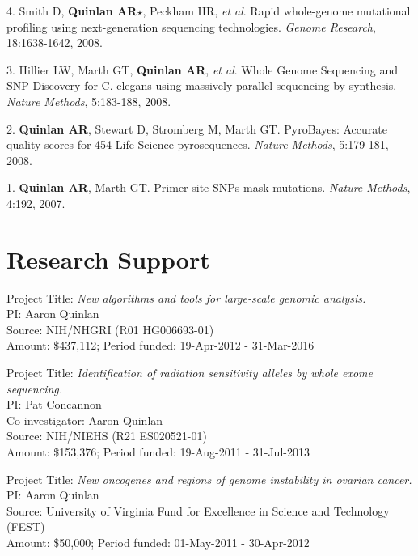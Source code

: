 \documentclass[margin,line]{cv}
\begin{document}
\begin{resume}
\begin{list}{*}{}
    \item[4.] Smith D, \textbf{Quinlan AR}$\star$, Peckham HR, \textit{et al}. 
    Rapid whole-genome mutational profiling using next-generation sequencing technologies. 
    \textit{Genome Research}, 18:1638-1642, 2008.

    \item[3.] Hillier LW, Marth GT, \textbf{Quinlan AR}, \textit{et al}. 
    Whole Genome Sequencing and SNP Discovery for C. elegans using massively parallel sequencing-by-synthesis. 
    \textit{Nature Methods}, 5:183-188, 2008.
    
    \item[2.] \textbf{Quinlan AR}, Stewart D, Stromberg M, Marth GT. 
    PyroBayes: Accurate quality scores for 454 Life Science pyrosequences.
    \textit{Nature Methods}, 5:179-181, 2008.
    
    \item[1.] \textbf{Quinlan AR}, Marth GT. 
    Primer-site SNPs mask mutations. 
    \textit{Nature Methods}, 4:192, 2007.

    \end{list}
    

    \section{\mysidestyle Research Support}

    Project Title: \textit{New algorithms and tools for large-scale genomic analysis.} \\
    PI: Aaron Quinlan \\
    Source: NIH/NHGRI (R01 HG006693-01) \\
    Amount: \$437,112; Period funded: 19-Apr-2012 - 31-Mar-2016
    
    Project Title: \textit{Identification of radiation sensitivity alleles by whole exome sequencing.} \\
    PI: Pat Concannon \\
    Co-investigator: Aaron Quinlan \\
    Source: NIH/NIEHS (R21 ES020521-01) \\
    Amount: \$153,376; Period funded: 19-Aug-2011 - 31-Jul-2013
    
    \vspace{-2mm}
    Project Title: \textit{New oncogenes and regions of genome instability in ovarian cancer.} \\
    PI: Aaron Quinlan \\
    Source: University of Virginia Fund for Excellence in Science and Technology (FEST) \\
    Amount: \$50,000; Period funded: 01-May-2011 - 30-Apr-2012
    

\end{resume}
\end{document}
